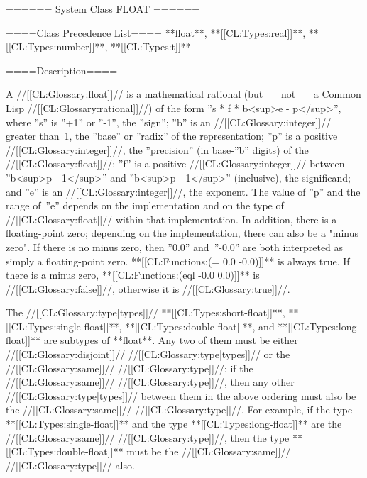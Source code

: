 ====== System Class FLOAT ======

====Class Precedence List==== 
**float**, **[[CL:Types:real]]**, **[[CL:Types:number]]**, **[[CL:Types:t]]**

====Description====

A //[[CL:Glossary:float]]// is a mathematical rational (but __not__ a Common Lisp //[[CL:Glossary:rational]]//) of the form ''s * f * b<sup>e - p</sup>'', where ''s'' is ''+1'' or ''-1'', the ''sign''; ''b'' is an //[[CL:Glossary:integer]]// greater than~1, the ''base'' or ''radix'' of the representation; ''p'' is a positive //[[CL:Glossary:integer]]//, the ''precision'' (in base-''b'' digits) of the //[[CL:Glossary:float]]//; ''f'' is a positive //[[CL:Glossary:integer]]// between ''b<sup>p - 1</sup>'' and ''b<sup>p - 1</sup>'' (inclusive), the significand; and ''e'' is an //[[CL:Glossary:integer]]//, the exponent. The value of ''p'' and the range of~''e'' depends on the implementation and on the type of //[[CL:Glossary:float]]// within that implementation. In addition, there is a floating-point zero; depending on the implementation, there can also be a "minus zero". If there is no minus zero, then ''0.0'' and~''-0.0'' are both interpreted as simply a floating-point zero. **[[CL:Functions:(= 0.0 -0.0)]]** is always true. If there is a minus zero, **[[CL:Functions:(eql -0.0 0.0)]]** is //[[CL:Glossary:false]]//, otherwise it is //[[CL:Glossary:true]]//.



The //[[CL:Glossary:type|types]]// **[[CL:Types:short-float]]**, **[[CL:Types:single-float]]**, **[[CL:Types:double-float]]**, and **[[CL:Types:long-float]]** are subtypes of **float**. Any two of them must be either //[[CL:Glossary:disjoint]]// //[[CL:Glossary:type|types]]// or the //[[CL:Glossary:same]]// //[[CL:Glossary:type]]//; if the //[[CL:Glossary:same]]// //[[CL:Glossary:type]]//, then any other //[[CL:Glossary:type|types]]// between them in the above ordering must also be the //[[CL:Glossary:same]]// //[[CL:Glossary:type]]//. For example, if the type **[[CL:Types:single-float]]** and the type **[[CL:Types:long-float]]** are the //[[CL:Glossary:same]]// //[[CL:Glossary:type]]//, then the type **[[CL:Types:double-float]]** must be the //[[CL:Glossary:same]]// //[[CL:Glossary:type]]// also.

